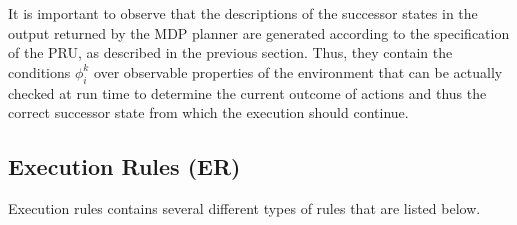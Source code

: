 


It is important to observe that the descriptions of the successor states in the output returned by the MDP planner are generated according to the specification of the PRU, as described in the previous section. Thus, they contain the conditions $\phi_i^k$ over observable properties of the environment that can be actually checked at run time to determine the current outcome of actions and thus the correct successor state from which the execution should continue.





\subsection{Execution Rules (ER)}

Execution rules contains several different types of rules that are listed below.

\vspace{0.5cm}

